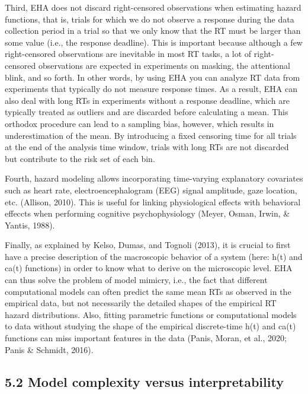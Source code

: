 \documentclass[
  man,floatsintext]{apa6}
\begin{document}
Third, EHA does not discard right-censored observations when estimating hazard functions, that is, trials for which we do not observe a response during the data collection period in a trial so that we only know that the RT must be larger than some value (i.e., the response deadline). This is important because although a few right-censored observations are inevitable in most RT tasks, a lot of right-censored observations are expected in experiments on masking, the attentional blink, and so forth. In other words, by using EHA you can analyze RT data from experiments that typically do not measure response times. As a result, EHA can also deal with long RTs in experiments without a response deadline, which are typically treated as outliers and are discarded before calculating a mean. This orthodox procedure can lead to a sampling bias, however, which results in underestimation of the mean. By introducing a fixed censoring time for all trials at the end of the analysis time window, trials with long RTs are not discarded but contribute to the risk set of each bin.

Fourth, hazard modeling allows incorporating time-varying explanatory covariates such as heart rate, electroencephalogram (EEG) signal amplitude, gaze location, etc. (Allison, 2010). This is useful for linking physiological effects with behavioral effeccts when performing cognitive psychophysiology (Meyer, Osman, Irwin, \& Yantis, 1988).

Finally, as explained by Kelso, Dumas, and Tognoli (2013), it is crucial to first have a precise description of the macroscopic behavior of a system (here: h(t) and ca(t) functions) in order to know what to derive on the microscopic level. EHA can thus solve the problem of model mimicry, i.e., the fact that different computational models can often predict the same mean RTs as observed in the empirical data, but not necessarily the detailed shapes of the empirical RT hazard distributions. Also, fitting parametric functions or computational models to data without studying the shape of the empirical discrete-time h(t) and ca(t) functions can miss important features in the data (Panis, Moran, et al., 2020; Panis \& Schmidt, 2016).

\subsection{5.2 Model complexity versus interpretability}\label{model-complexity-versus-interpretability}
\end{document}
